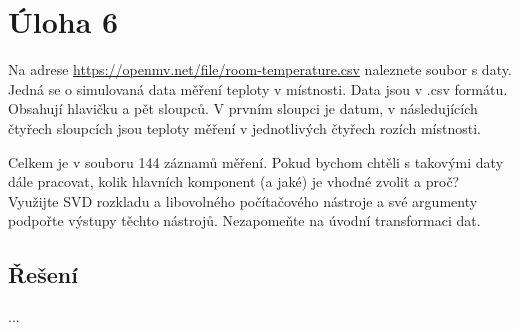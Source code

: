 \documentclass[10pt, a4paper]{ReportSheet}
\newcommand{\uloha}[4]{
    \section{Úloha #1\hfill\small\normalfont{(#2 body)}}
    \label{sec:uloha-#1}
    #3
    \subsection{Řešení}
    \label{subsec:uloha-#1-reseni}
    #4
    \newpage
}
\begin{document}
    \uloha{6}{3}{
        Na adrese \url{https://openmv.net/file/room-temperature.csv} naleznete soubor s daty. Jedná se o simulovaná data měření teploty v místnosti. Data jsou v .csv formátu. Obsahují hlavičku a pět sloupců. V prvním sloupci je datum, v následujících čtyřech sloupcích jsou teploty měření v jednotlivých čtyřech rozích místnosti.

        Celkem je v souboru 144 záznamů měření. Pokud bychom chtěli s takovými daty dále pracovat, kolik hlavních komponent (a jaké) je vhodné zvolit a proč?
        Využijte SVD rozkladu a libovolného počítačového nástroje a své argumenty podpořte výstupy těchto nástrojů. Nezapomeňte na úvodní transformaci dat.
    }{
        ...
        \answerbox{–}
    }
\end{document}
